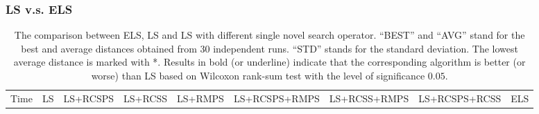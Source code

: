 \documentclass[journal]{IEEEtran}
\begin{document}
\subsubsection{LS v.s. ELS}\label{sec:ls_els}
\begin{table}[htbp]
	\centering
	\caption{\label{tab:ls_els_comparison}
		The comparison between ELS, LS and LS with different single novel search operator. ``BEST'' and ``AVG'' stand for the best and average distances obtained from 30 independent runs. ``STD'' stands for the standard deviation. The lowest average distance is marked with *. Results in bold (or underline) indicate that the corresponding algorithm is better (or worse) than LS based on Wilcoxon rank-sum test with the level of significance $0.05$.}
	\setlength{\tabcolsep}{1.4pt}
	\scriptsize
	\begin{tabular}{|c|ccc|ccc|ccc|ccc|ccc|ccc|ccc|ccc|}
		\hline
		\multirow{1}{*}{Time} & 
		\multicolumn{3}{c|}{LS} &
		\multicolumn{3}{c|}{LS+RCSPS} &
		\multicolumn{3}{c|}{LS+RCSS} &
		\multicolumn{3}{c|}{LS+RMPS} &
		\multicolumn{3}{c|}{LS+RCSPS+RMPS} &
		\multicolumn{3}{c|}{LS+RCSS+RMPS} &
		\multicolumn{3}{c|}{LS+RCSPS+RCSS} &
		\multicolumn{3}{c|}{ELS}\\
		

\end{tabular}
\end{table}
\end{document}

